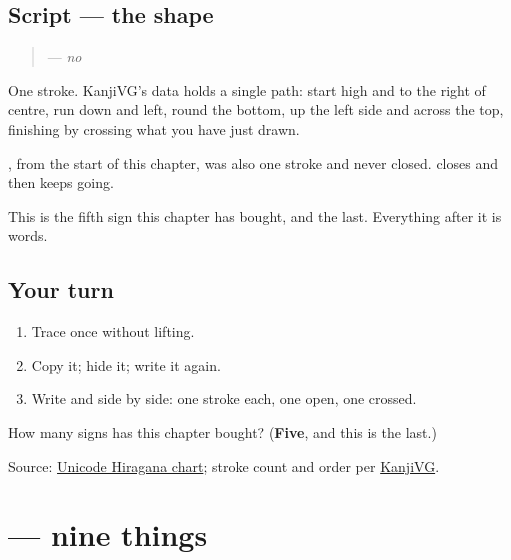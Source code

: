 \subsection*{Script — the shape}

\begin{quote}
\textbf{} — \emph{no}
\end{quote}

One stroke. KanjiVG's data holds a single path: start high and to the right of centre, run down and left, round the bottom, up the left side and across the top, finishing by crossing what you have just drawn.

\textbf{}, from the start of this chapter, was also one stroke and never closed. \textbf{} closes and then keeps going.

This is the fifth sign this chapter has bought, and the last. Everything after it is words.

\subsection*{Your turn}
\begin{enumerate}
\raggedright
  \item Trace \textbf{} once without lifting.
  \item Copy it; hide it; write it again.
  \item Write \textbf{} and \textbf{} side by side: one stroke each, one open, one crossed.
\end{enumerate}

\begin{tcolorbox}[breakable,colback=teal!4,colframe=teal!35!black,title={Before you move on}]
How many signs has this chapter bought? (\textbf{Five}, and this is the last.)

Source: \href{https://www.unicode.org/charts/PDF/U3040.pdf}{Unicode Hiragana chart}; stroke count and order per \href{https://kanjivg.tagaini.net/kanjivg/kanji/0306e.html}{KanjiVG}.
\end{tcolorbox}
\section[\texorpdfstring{\ja{ここのつ} (kokonotsu)}{ここのつ (kokonotsu)}]{ — nine things}

\label{lesson:JA-C17-kokonotsu}



